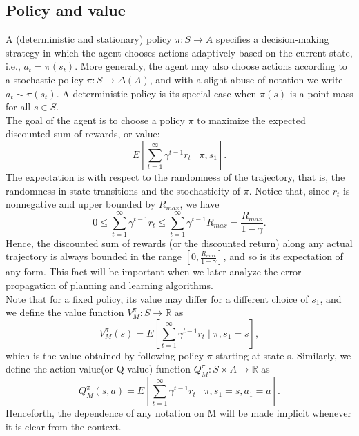 \documentclass{report}
\begin{document}
\subsection{Policy and value}
A (deterministic and stationary) policy $\pi:S\rightarrow A$ specifies a decision-making strategy in which the agent chooses actions adaptively based on the current state, i.e., $a_t = \pi(s_t)$. More generally, the agent may also choose actions according to a stochastic policy $\pi:S\rightarrow \Delta(A)$, and with a slight abuse of notation we write $a_t \sim \pi(s_t)$. A deterministic policy is its special case when $\pi(s)$ is a point mass for all $s\in S$. \\
The goal of the agent is to choose a policy $\pi$ to maximize the expected discounted sum of rewards, or value:
\begin{equation}
    E[\sum_{t=1}^{\infty}\gamma^{t-1}r_t\mid \pi,s_1].
\end{equation}
The expectation is with respect to the randomness of the trajectory, that is, the randomness in state transitions and the stochasticity of $\pi$. Notice that, since $r_t$ is nonnegative and upper bounded by $R_{max}$, we have
\begin{equation}
    0 \leq \sum_{t=1}^{\infty}\gamma^{t-1}r_t \leq \sum_{t=1}^{\infty}\gamma^{t-1}R_{max}=\frac{R_{max}}{1-\gamma}.
\end{equation}
Hence, the discounted sum of rewards (or the discounted return) along any actual trajectory is always
bounded in the range $[0,\frac{R_{max}}{1-\gamma}]$, and so is its expectation of any form. This fact will be important when we later analyze the error propagation of planning and learning algorithms.\\
Note that for a fixed policy, its value may differ for a different choice of $s_1$, and we define the value function $V_{M}^{\pi}:S \rightarrow \mathbb{R}$ as 
\[
V_{M}^{\pi}(s)=E[\sum_{t=1}^{\infty}\gamma^{t-1}r_t\mid \pi, s_1=s],
\]
which is the value obtained by following policy $\pi$ starting at state s. Similarly, we define the action-value(or Q-value) function $Q_M^{\pi}:S\times A \rightarrow \mathbb{R}$ as 
\[
Q_M^{\pi}(s,a)=E[\sum_{t=1}^{\infty}\gamma^{t-1}r_t\mid \pi, s_1=s,a_1=a].
\]
Henceforth, the dependence of any notation on M will be made implicit whenever it is clear from the context.
\end{document}
